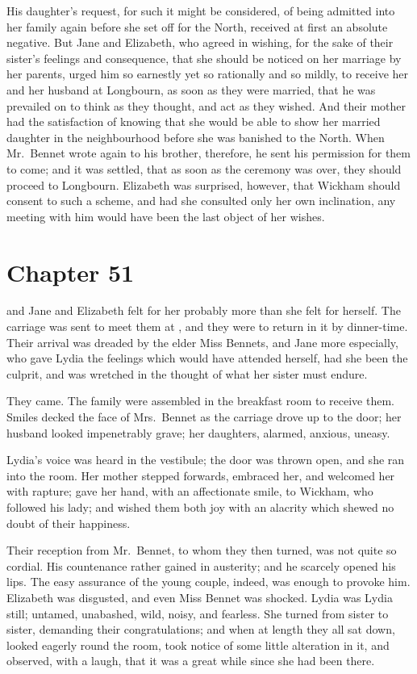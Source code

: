 His daughter's request, for such it might be considered, of being
admitted into her family again before she set off for the North,
received at first an absolute negative.  But Jane and Elizabeth,
who agreed in wishing, for the sake of their sister's feelings and
consequence, that she should be noticed on her marriage by her
parents, urged him so earnestly yet so rationally and so mildly,
to receive her and her husband at Longbourn, as soon as they
were married, that he was prevailed on to think as they thought,
and act as they wished.  And their mother had the satisfaction
of knowing that she would be able to show her married daughter
in the neighbourhood before she was banished to the North.  When
Mr.\ Bennet wrote again to his brother, therefore, he sent his
permission for them to come; and it was settled, that as soon
as the ceremony was over, they should proceed to Longbourn.
Elizabeth was surprised, however, that Wickham should consent
to such a scheme, and had she consulted only her own inclination,
any meeting with him would have been the last object of her wishes.



\chapter{Chapter 51}


 and Jane and Elizabeth felt
for her probably more than she felt for herself.  The carriage
was sent to meet them at \gdash{}, and they were to return in it
by dinner-time.  Their arrival was dreaded by the elder Miss
Bennets, and Jane more especially, who gave Lydia the feelings
which would have attended herself, had she been the culprit,
and was wretched in the thought of what her sister must endure.

They came.  The family were assembled in the breakfast room to
receive them.  Smiles decked the face of Mrs.\ Bennet as the
carriage drove up to the door; her husband looked impenetrably
grave; her daughters, alarmed, anxious, uneasy.

Lydia's voice was heard in the vestibule; the door was thrown
open, and she ran into the room.  Her mother stepped forwards,
embraced her, and welcomed her with rapture; gave her hand,
with an affectionate smile, to Wickham, who followed his lady;
and wished them both joy with an alacrity which shewed no doubt
of their happiness.

Their reception from Mr.\ Bennet, to whom they then turned, was
not quite so cordial.  His countenance rather gained in austerity;
and he scarcely opened his lips.  The easy assurance of the
young couple, indeed, was enough to provoke him.  Elizabeth was
disgusted, and even Miss Bennet was shocked.  Lydia was Lydia
still; untamed, unabashed, wild, noisy, and fearless.  She turned
from sister to sister, demanding their congratulations; and when
at length they all sat down, looked eagerly round the room, took
notice of some little alteration in it, and observed, with a
laugh, that it was a great while since she had been there.

